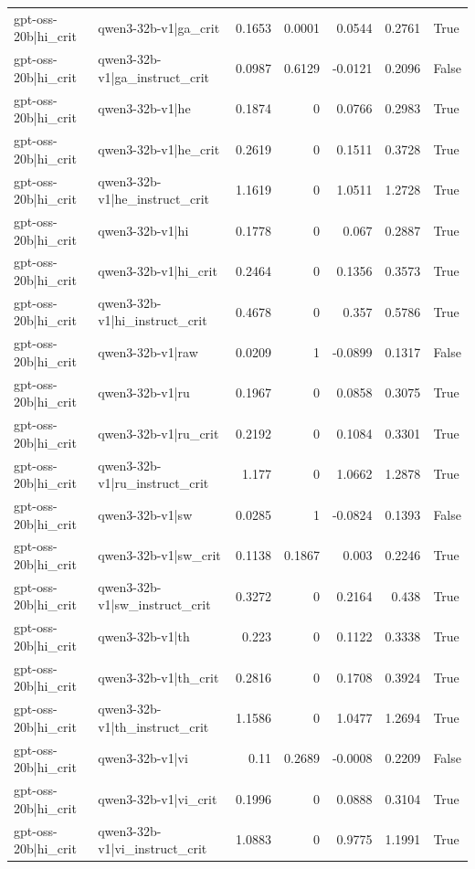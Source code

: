 \begin{table}
\begin{tabular}{l l r r r r l}
gpt-oss-20b|hi_crit & qwen3-32b-v1|ga_crit & 0.1653 & 0.0001 & 0.0544 & 0.2761 & True \\
gpt-oss-20b|hi_crit & qwen3-32b-v1|ga_instruct_crit & 0.0987 & 0.6129 & -0.0121 & 0.2096 & False \\
gpt-oss-20b|hi_crit & qwen3-32b-v1|he & 0.1874 & 0 & 0.0766 & 0.2983 & True \\
gpt-oss-20b|hi_crit & qwen3-32b-v1|he_crit & 0.2619 & 0 & 0.1511 & 0.3728 & True \\
gpt-oss-20b|hi_crit & qwen3-32b-v1|he_instruct_crit & 1.1619 & 0 & 1.0511 & 1.2728 & True \\
gpt-oss-20b|hi_crit & qwen3-32b-v1|hi & 0.1778 & 0 & 0.067 & 0.2887 & True \\
gpt-oss-20b|hi_crit & qwen3-32b-v1|hi_crit & 0.2464 & 0 & 0.1356 & 0.3573 & True \\
gpt-oss-20b|hi_crit & qwen3-32b-v1|hi_instruct_crit & 0.4678 & 0 & 0.357 & 0.5786 & True \\
gpt-oss-20b|hi_crit & qwen3-32b-v1|raw & 0.0209 & 1 & -0.0899 & 0.1317 & False \\
gpt-oss-20b|hi_crit & qwen3-32b-v1|ru & 0.1967 & 0 & 0.0858 & 0.3075 & True \\
gpt-oss-20b|hi_crit & qwen3-32b-v1|ru_crit & 0.2192 & 0 & 0.1084 & 0.3301 & True \\
gpt-oss-20b|hi_crit & qwen3-32b-v1|ru_instruct_crit & 1.177 & 0 & 1.0662 & 1.2878 & True \\
gpt-oss-20b|hi_crit & qwen3-32b-v1|sw & 0.0285 & 1 & -0.0824 & 0.1393 & False \\
gpt-oss-20b|hi_crit & qwen3-32b-v1|sw_crit & 0.1138 & 0.1867 & 0.003 & 0.2246 & True \\
gpt-oss-20b|hi_crit & qwen3-32b-v1|sw_instruct_crit & 0.3272 & 0 & 0.2164 & 0.438 & True \\
gpt-oss-20b|hi_crit & qwen3-32b-v1|th & 0.223 & 0 & 0.1122 & 0.3338 & True \\
gpt-oss-20b|hi_crit & qwen3-32b-v1|th_crit & 0.2816 & 0 & 0.1708 & 0.3924 & True \\
gpt-oss-20b|hi_crit & qwen3-32b-v1|th_instruct_crit & 1.1586 & 0 & 1.0477 & 1.2694 & True \\
gpt-oss-20b|hi_crit & qwen3-32b-v1|vi & 0.11 & 0.2689 & -0.0008 & 0.2209 & False \\
gpt-oss-20b|hi_crit & qwen3-32b-v1|vi_crit & 0.1996 & 0 & 0.0888 & 0.3104 & True \\
gpt-oss-20b|hi_crit & qwen3-32b-v1|vi_instruct_crit & 1.0883 & 0 & 0.9775 & 1.1991 & True \\

\end{tabular}
\end{table}
